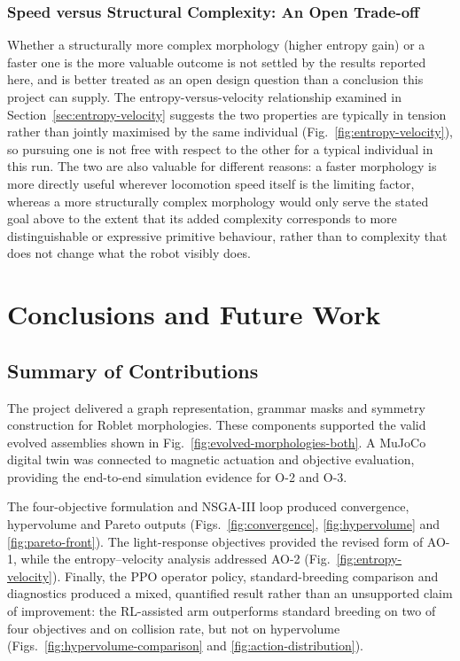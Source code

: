\documentclass[12pt,a4paper]{report}
\begin{document}
\subsection{Speed versus Structural Complexity: An Open Trade-off}
Whether a structurally more complex morphology (higher entropy gain) or a faster one is the more valuable outcome is not settled by the results reported here, and is better treated as an open design question than a conclusion this project can supply. The entropy-versus-velocity relationship examined in Section~\ref{sec:entropy-velocity} suggests the two properties are typically in tension rather than jointly maximised by the same individual (Fig.~\ref{fig:entropy-velocity}), so pursuing one is not free with respect to the other for a typical individual in this run. The two are also valuable for different reasons: a faster morphology is more directly useful wherever locomotion speed itself is the limiting factor, whereas a more structurally complex morphology would only serve the stated goal above to the extent that its added complexity corresponds to more distinguishable or expressive primitive behaviour, rather than to complexity that does not change what the robot visibly does.

\chapter{Conclusions and Future Work}
\label{ch:conclusion}

\section{Summary of Contributions}
The project delivered a graph representation, grammar masks and symmetry construction for Roblet morphologies. These components supported the valid evolved assemblies shown in Fig.~\ref{fig:evolved-morphologies-both}. A MuJoCo digital twin was connected to magnetic actuation and objective evaluation, providing the end-to-end simulation evidence for O-2 and O-3.

The four-objective formulation and NSGA-III loop produced convergence, hypervolume and Pareto outputs (Figs.~\ref{fig:convergence}, \ref{fig:hypervolume} and \ref{fig:pareto-front}). The light-response objectives provided the revised form of AO-1, while the entropy--velocity analysis addressed AO-2 (Fig.~\ref{fig:entropy-velocity}). Finally, the PPO operator policy, standard-breeding comparison and diagnostics produced a mixed, quantified result rather than an unsupported claim of improvement: the RL-assisted arm outperforms standard breeding on two of four objectives and on collision rate, but not on hypervolume (Figs.~\ref{fig:hypervolume-comparison} and \ref{fig:action-distribution}).
\end{document}
